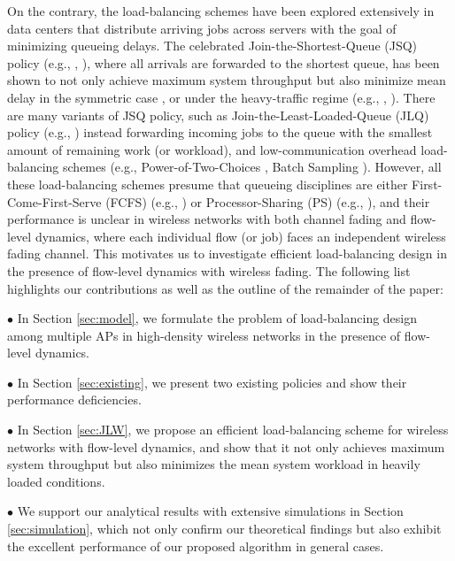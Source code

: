 \documentclass[10pt, conference, letterpaper]{IEEEtran} %
\begin{document}
On the contrary, the load-balancing schemes have been explored extensively in data centers that distribute arriving jobs across servers with the goal of minimizing queueing delays. The celebrated Join-the-Shortest-Queue (JSQ) policy (e.g., \cite{whi86}, \cite{foschini1978basic}), where all arrivals are forwarded to the shortest queue, has been shown to not only achieve maximum system throughput but also minimize mean delay in the symmetric case \cite{taseph93}, or under the heavy-traffic regime (e.g., \cite{foschini1978basic}, \cite{erysri12}). There are many variants of JSQ policy, such as Join-the-Least-Loaded-Queue (JLQ) policy (e.g., \cite{gupta2007analysis}) instead forwarding incoming jobs to the queue with the smallest amount of remaining work (or workload), and low-communication overhead load-balancing schemes (e.g., Power-of-Two-Choices \cite{vvedenskaya1996queueing,mitzenmacher2001power}, Batch Sampling \cite{ousterhout2013sparrow,ying2015power}). However, all these load-balancing schemes presume that queueing disciplines are either First-Come-First-Serve (FCFS) (e.g., \cite{foschini1978basic,whi86,vvedenskaya1996queueing,
mitzenmacher2001power,ousterhout2013sparrow,ying2015power}) or Processor-Sharing (PS) (e.g., \cite{bonomi1990job,gupta2007analysis}), and their performance is unclear in wireless networks with both channel fading and flow-level dynamics, where each individual flow (or job) faces an independent wireless fading channel. This motivates us to investigate efficient load-balancing design in the presence of flow-level dynamics with wireless fading. The following list highlights our contributions as well as the outline of the remainder of the paper:

$\bullet$ In Section \ref{sec:model}, we formulate the problem of load-balancing design among multiple APs in high-density wireless networks in the presence of flow-level dynamics. 

$\bullet$ In Section \ref{sec:existing}, we present two existing policies and show their performance deficiencies.

$\bullet$ In Section \ref{sec:JLW}, we propose an efficient load-balancing scheme for wireless networks with flow-level dynamics, and show that it not only achieves maximum system throughput but also minimizes the mean system workload in heavily loaded conditions.

$\bullet$ We support our analytical results with extensive simulations in Section \ref{sec:simulation}, which not only confirm our theoretical findings but also exhibit the excellent performance of our proposed algorithm in general cases.
\end{document}
